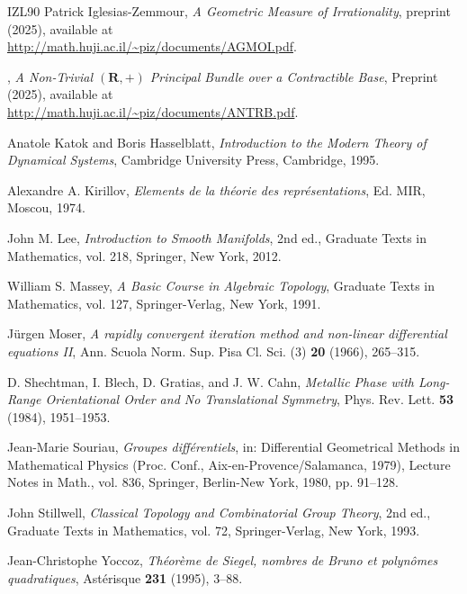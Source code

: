 \documentclass[10pt,letterpaper,reqno]{amsart}
\theoremstyle{article}
\newcommand{\1}{{\hat 1}}
\newcommand{\0}{{\hat 0}}
\newcommand{\RR}{\mathbf R}
\begin{document}
\begin{thebibliography}{IZL90}
    Patrick Iglesias-Zemmour,
    \emph{A Geometric Measure of Irrationality},
    preprint (2025), available at \\
    \url{http://math.huji.ac.il/~piz/documents/AGMOI.pdf}.
    
    \bysame,
    \emph{A Non-Trivial $(\RR,+)$ Principal Bundle over a Contractible Base},
    Preprint (2025), available at \\
    \url{http://math.huji.ac.il/~piz/documents/ANTRB.pdf}.

    Anatole Katok and Boris Hasselblatt,
    \emph{Introduction to the Modern Theory of Dynamical Systems},
    Cambridge University Press, Cambridge, 1995.
    
    Alexandre A. Kirillov,
    \emph{Elements de la th{\'e}orie des repr{\'e}sentations},
    Ed. MIR, Moscou, 1974.
    
    John M. Lee,
    \emph{Introduction to Smooth Manifolds}, 2nd ed.,
    Graduate Texts in Mathematics, vol. 218, Springer, New York, 2012.
    
    William S. Massey,
    \emph{A Basic Course in Algebraic Topology},
    Graduate Texts in Mathematics, vol. 127, Springer-Verlag, New York, 1991.
    
    Jürgen Moser, %
    \emph{A rapidly convergent iteration method and non-linear differential equations II},
    Ann. Scuola Norm. Sup. Pisa Cl. Sci. (3) \textbf{20} (1966), 265--315.
    
    D. Shechtman, I. Blech, D. Gratias, and J. W. Cahn,
    \emph{Metallic Phase with Long-Range Orientational Order and No Translational Symmetry},
    Phys. Rev. Lett. \textbf{53} (1984), 1951--1953.

    Jean-Marie Souriau, %
    \emph{Groupes différentiels},
    in: Differential Geometrical Methods in Mathematical Physics (Proc. Conf., Aix-en-Provence/Salamanca, 1979), Lecture Notes in Math., vol. 836, Springer, Berlin-New York, 1980, pp. 91--128.
    
    John Stillwell,
    \emph{Classical Topology and Combinatorial Group Theory}, 2nd ed.,
    Graduate Texts in Mathematics, vol. 72, Springer-Verlag, New York, 1993.
    
    Jean-Christophe Yoccoz, %
    \emph{Théorème de Siegel, nombres de Bruno et polynômes quadratiques},
    Astérisque \textbf{231} (1995), 3--88.
    
  \end{thebibliography}
  
  
\end{document}
